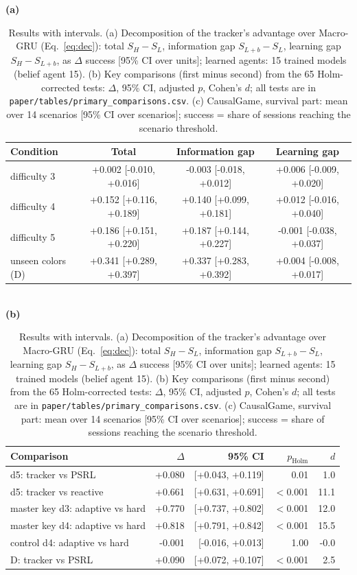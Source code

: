 \documentclass[conference]{IEEEtran}
\begin{document}
\begin{table}[!t]
\caption{Results with intervals. (a) Decomposition of the tracker's advantage over Macro-GRU (Eq.~\eqref{eq:dec}): total $S_H-S_L$, information gap $S_{L+b}-S_L$, learning gap $S_H-S_{L+b}$, as $\Delta$ success [95\% CI over units]; learned agents: 15 trained models (belief agent 15). (b) Key comparisons (first minus second) from the 65 Holm-corrected tests: $\Delta$, 95\% CI, adjusted $p$, Cohen's $d$; all tests are in \texttt{paper/tables/primary\_comparisons.csv}. (c) CausalGame, survival part: mean over 14 scenarios [95\% CI over scenarios]; success = share of sessions reaching the scenario threshold.}\label{tab:res}
\centering\scriptsize\setlength{\tabcolsep}{3pt}
\begin{minipage}[t]{0.57\textwidth}\centering\textbf{(a)}\\[2pt]
\begin{tabular}{lccc}
\toprule
Condition & Total & Information gap & Learning gap \\
\midrule
difficulty 3 & +0.002 [-0.010, +0.016] & -0.003 [-0.018, +0.012] & +0.006 [-0.009, +0.020] \\
difficulty 4 & +0.152 [+0.116, +0.189] & +0.140 [+0.099, +0.181] & +0.012 [-0.016, +0.040] \\
difficulty 5 & +0.186 [+0.151, +0.220] & +0.187 [+0.144, +0.227] & -0.001 [-0.038, +0.037] \\
unseen colors (D) & +0.341 [+0.289, +0.397] & +0.337 [+0.283, +0.392] & +0.004 [-0.008, +0.017] \\
\bottomrule
\end{tabular}\\[6pt]\textbf{(b)}\\[2pt]
\begin{tabular}{lrrrr}
\toprule
Comparison & $\Delta$ & 95\% CI & $p_{\text{Holm}}$ & $d$ \\
\midrule
d5: tracker vs PSRL & +0.080 & [+0.043, +0.119] & 0.01 & 1.0 \\
d5: tracker vs reactive & +0.661 & [+0.631, +0.691] & $<$0.001 & 11.1 \\
master key d3: adaptive vs hard & +0.770 & [+0.737, +0.802] & $<$0.001 & 12.0 \\
master key d4: adaptive vs hard & +0.818 & [+0.791, +0.842] & $<$0.001 & 15.5 \\
control d4: adaptive vs hard & -0.001 & [-0.016, +0.013] & 1.00 & -0.0 \\
D: tracker vs PSRL & +0.090 & [+0.072, +0.107] & $<$0.001 & 2.5 \\

\end{tabular}
\end{minipage}
\end{table}
\end{document}
